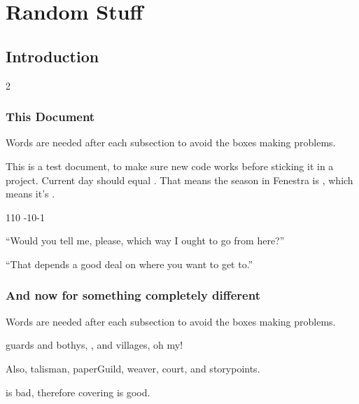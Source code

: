 \documentclass[a4paper,openany]{book}
\date{\today}
\begin{document}
\frontmatter

\chapter{Random Stuff}

\section{Introduction}

\begin{multicols}{2}

\subsection{This Document}
Words are needed after each subsection to avoid the boxes making problems.



This is a test document, to make sure new code works before sticking it in a project.
Current day should equal .
That means the season in Fenestra is \showCycle, which means it's \showTemperature.

%
  {{1}{1}{0}}%
  {{-1}{0}{-1}}%
  {%
    \spear
    \partialchain
  }%
  {}%
  {\lootMedium}%
  {}%



\begin{speechtext}

  ``Would you tell me, please, which way I ought to go from here?''

  ``That depends a good deal on where you want to get to.''

\end{speechtext}

\subsection{And now for something completely different}
Words are needed after each subsection to avoid the boxes making problems.

\Glspl{guard} and \glspl{bothy}, , and \glspl{village}, oh my!

Also, \gls{talisman}, \gls{paperGuild}, \gls{weaver}, \gls{court}, and \glspl{storypoint}.

 is bad, therefore \gls{covering} is good.


\end{multicols}
\end{document}
